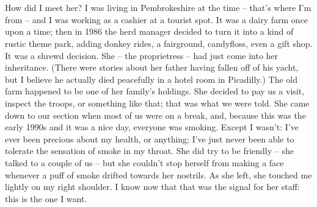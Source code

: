 \renewcommand{\thesection}{\Roman{section}} 


\section{}

How did I meet her? I was living in Pembrokeshire at the time -- that's where I'm from -- and I was working as a cashier at a tourist spot. It was a dairy farm once upon a time; then in 1986 the herd manager decided to turn it into a kind of rustic theme park, adding donkey rides, a fairground, candyfloss, even a gift shop. It was a shrewd decision. She -- the proprietress -- had just come into her inheritance. (There were stories about her father having fallen off of his yacht, but I believe he actually died peacefully in a hotel room in Picadilly.) The old farm happened to be one of her family's holdings. She decided to pay us a visit, inspect the troops, or something like that; that was what we were told. She came down to our section when most of us were on a break, and, because this was the early 1990s and it was a nice day, everyone was smoking. Except I wasn't: I've ever been precious about my health, or anything; I've just never been able to tolerate the sensation of smoke in my throat. She did try to be friendly -- she talked to a couple of us -- but she couldn't stop herself from making a face whenever a puff of smoke drifted towards her nostrils. As she left, she touched me lightly on my right shoulder. I know now that that was the signal for her staff: this is the one I want.
